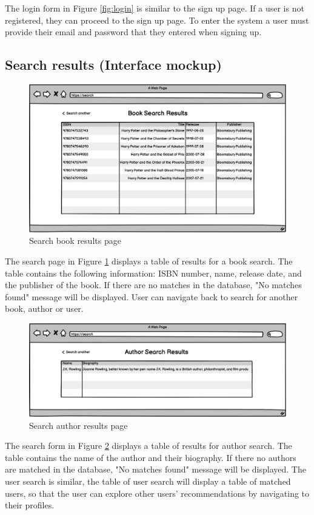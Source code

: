 The login form in Figure \ref{fig:login} is similar to the sign up page. If a user is not registered, they can proceed to the sign up page. To enter the system a user must provide their email and password that they entered when signing up.

\subsection{Search results (Interface mockup)}

\begin{figure}[h]
    \centering
    \includegraphics[width=0.6\linewidth]{sections/PLL/search-book.png}
    \caption{Search book results page}
    \label{fig:search-book}
\end{figure}

The search page in Figure \ref{fig:search-book} displays a table of results for a book search. The table contains the following information: ISBN number, name, release date, and the publisher of the book. If there are no matches in the database, "No matches found" message will be displayed. User can navigate back to search for another book, author or user.

\begin{figure}[h]
    \centering
    \includegraphics[width=0.6\linewidth]{sections/PLL/search-author.png}
    \caption{Search author results page}
    \label{fig:search-author}
\end{figure}

The search form in Figure \ref{fig:search-author} displays a table of results for author search. The table contains the name of the author and their biography. If there no authors are matched in the database, "No matches found" message will be displayed. The user search is similar, the table of user search will display a table of matched users, so that the user can explore other users' recommendations by navigating to their profiles.
